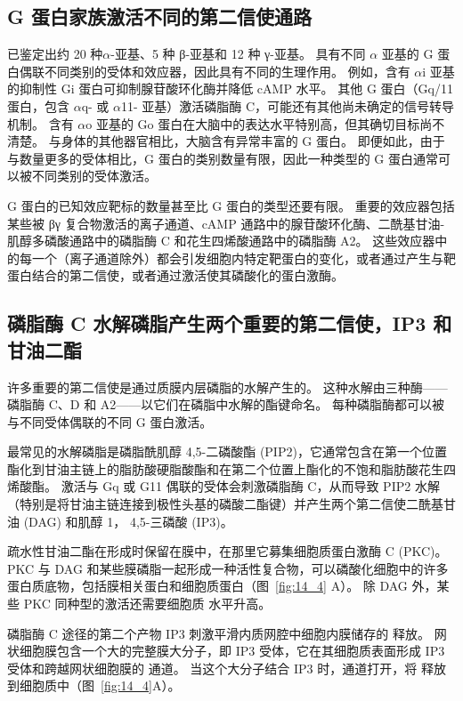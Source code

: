 \subsection{G 蛋白家族激活不同的第二信使通路}

已鉴定出约 20 种$\alpha$-亚基、5 种 β-亚基和 12 种 γ-亚基。
具有不同 $\alpha$ 亚基的 G 蛋白偶联不同类别的受体和效应器，因此具有不同的生理作用。
例如，含有 $\alpha$i 亚基的抑制性 Gi 蛋白可抑制腺苷酸环化酶并降低 cAMP 水平。
其他 G 蛋白（Gq/11 蛋白，包含 $\alpha$q- 或 $\alpha$11- 亚基）激活磷脂酶 C，可能还有其他尚未确定的信号转导机制。
含有 $\alpha$o 亚基的 Go 蛋白在大脑中的表达水平特别高，但其确切目标尚不清楚。
与身体的其他器官相比，大脑含有异常丰富的 G 蛋白。
即便如此，由于与数量更多的受体相比，G 蛋白的类别数量有限，因此一种类型的 G 蛋白通常可以被不同类别的受体激活。


G 蛋白的已知效应靶标的数量甚至比 G 蛋白的类型还要有限。
重要的效应器包括某些被 βγ 复合物激活的离子通道、cAMP 通路中的腺苷酸环化酶、二酰基甘油-肌醇多磷酸通路中的磷脂酶 C 和花生四烯酸通路中的磷脂酶 A2。
这些效应器中的每一个（离子通道除外）都会引发细胞内特定靶蛋白的变化，或者通过产生与靶蛋白结合的第二信使，或者通过激活使其磷酸化的蛋白激酶。



\subsection{磷脂酶 C 水解磷脂产生两个重要的第二信使，IP3 和甘油二酯}

许多重要的第二信使是通过质膜内层磷脂的水解产生的。 
这种水解由三种酶——磷脂酶 C、D 和 A2——以它们在磷脂中水解的酯键命名。
每种磷脂酶都可以被与不同受体偶联的不同 G 蛋白激活。


最常见的水解磷脂是磷脂酰肌醇 4,5-二磷酸酯 (PIP2)，它通常包含在第一个位置酯化到甘油主链上的脂肪酸硬脂酸酯和在第二个位置上酯化的不饱和脂肪酸花生四烯酸酯。
激活与 Gq 或 G11 偶联的受体会刺激磷脂酶 C，从而导致 PIP2 水解（特别是将甘油主链连接到极性头基的磷酸二酯键）并产生两个第二信使二酰基甘油 (DAG) 和肌醇 1， 4,5-三磷酸 (IP3)。


疏水性甘油二酯在形成时保留在膜中，在那里它募集细胞质蛋白激酶 C (PKC)。
PKC 与 DAG 和某些膜磷脂一起形成一种活性复合物，可以磷酸化细胞中的许多蛋白质底物，包括膜相关蛋白和细胞质蛋白（图~\ref{fig:14_4} A）。
除 DAG 外，某些 PKC 同种型的激活还需要细胞质  水平升高。


磷脂酶 C 途径的第二个产物 IP3 刺激平滑内质网腔中细胞内膜储存的  释放。
网状细胞膜包含一个大的完整膜大分子，即 IP3 受体，它在其细胞质表面形成 IP3 受体和跨越网状细胞膜的  通道。
当这个大分子结合 IP3 时，通道打开，将  释放到细胞质中（图~\ref{fig:14_4}A）。


